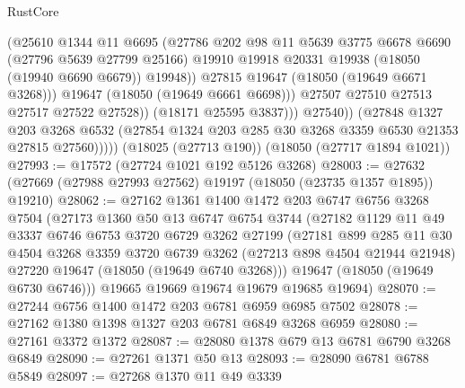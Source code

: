 \begin{lexlean}{RustCore}
\begin{coremodule}
                          (@25610
                            @1344
                            @11
                            @6695
                            (@27786
                              @202
                              @98
                              @11
                              @5639
                              @3775
                              @6678
                              @6690
                              (@27796 @5639 @27799 @25166)
                              @19910
                              @19918
                              @20331
                              @19938
                              (@18050 (@19940 @6690 @6679))
                              @19948))
                          @27815
                          @19647
                          (@18050 (@19649 @6671 @3268)))
                        @19647
                        (@18050 (@19649 @6661 @6698)))
                      @27507
                      @27510
                      @27513
                      @27517
                      @27522
                      @27528))
                  (@18171 @25595 @3837)))
              @27540))
          (@27848
            @1327
            @203
            @3268
            @6532
            (@27854 @1324 @203 @285 @30 @3268 @3359 @6530 @21353 @27815 @27560)))))
    (@18025 (@27713 @190))
    (@18050 (@27717 @1894 @1021))
@27993 := @17572 (@27724 @1021 @192 @5126 @3268)
@28003 := @27632 (@27669 (@27988 @27993 @27562) @19197 (@18050 (@23735 @1357 @1895)) @19210)
@28062 := @27162
    @1361
    @1400
    @1472
    @203
    @6747
    @6756
    @3268
    @7504
    (@27173
      @1360
      @50
      @13
      @6747
      @6754
      @3744
      (@27182
        @1129
        @11
        @49
        @3337
        @6746
        @6753
        @3720
        @6729
        @3262
        @27199
        (@27181
          @899
          @285
          @11
          @30
          @4504
          @3268
          @3359
          @3720
          @6739
          @3262
          (@27213 @898 @4504 @21944 @21948)
          @27220
          @19647
          (@18050 (@19649 @6740 @3268)))
        @19647
        (@18050 (@19649 @6730 @6746)))
      @19665
      @19669
      @19674
      @19679
      @19685
      @19694)
@28070 := @27244 @6756 @1400 @1472 @203 @6781 @6959 @6985 @7502
@28078 := @27162 @1380 @1398 @1327 @203 @6781 @6849 @3268 @6959
@28080 := @27161 @3372 @1372
@28087 := @28080 @1378 @679 @13 @6781 @6790 @3268 @6849
@28090 := @27261 @1371 @50 @13
@28093 := @28090 @6781 @6788 @5849
@28097 := @27268 @1370 @11 @49 @3339

\end{coremodule}
\end{lexlean}
